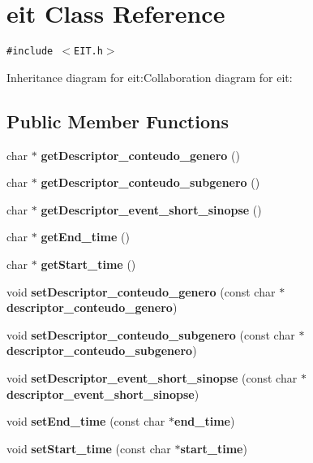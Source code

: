 \section{eit Class Reference}
\label{classbr_1_1ufscar_1_1lince_1_1ginga_1_1recommender_1_1eit}
{\tt \#include $<$EIT.h$>$}

Inheritance diagram for eit:Collaboration diagram for eit:\subsection*{Public Member Functions}
\begin{CompactItemize}
\item 
char $\ast$ {\bf getDescriptor\_\-conteudo\_\-genero} ()
\item 
char $\ast$ {\bf getDescriptor\_\-conteudo\_\-subgenero} ()
\item 
char $\ast$ {\bf getDescriptor\_\-event\_\-short\_\-sinopse} ()
\item 
char $\ast$ {\bf getEnd\_\-time} ()
\item 
char $\ast$ {\bf getStart\_\-time} ()
\item 
void {\bf setDescriptor\_\-conteudo\_\-genero} (const char $\ast${\bf descriptor\_\-conteudo\_\-genero})
\item 
void {\bf setDescriptor\_\-conteudo\_\-subgenero} (const char $\ast${\bf descriptor\_\-conteudo\_\-subgenero})
\item 
void {\bf setDescriptor\_\-event\_\-short\_\-sinopse} (const char $\ast${\bf descriptor\_\-event\_\-short\_\-sinopse})
\item 
void {\bf setEnd\_\-time} (const char $\ast${\bf end\_\-time})
\item 
void {\bf setStart\_\-time} (const char $\ast${\bf start\_\-time})
\end{CompactItemize}
